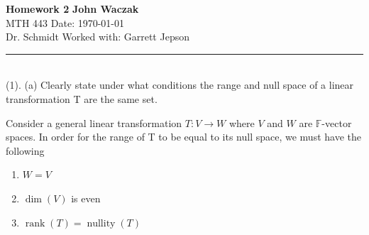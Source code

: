 \documentclass[a4paper, 11pt]{article}
\newcommand{\F}{\mathbb{F}}
\newenvironment{solution}{%
	\begin{list}{}{%
			\setlength{\topsep}{0pt}%
			\setlength{\leftmargin}{1.5cm}%
			\setlength{\rightmargin}{1.5cm}%
			\setlength{\listparindent}{\parindent}%
			\setlength{\itemindent}{\parindent}%
			\setlength{\parsep}{\parskip}%
		}%
		\item[]}{\end{list}}
\begin{document}
\noindent
\large\textbf{Homework 2} \hfill \textbf{John Waczak} \\
\normalsize MTH 443 \hfill  Date: \today \\
Dr. Schmidt \hfill Worked with: Garrett Jepson 
\par\noindent\rule{\textwidth}{0.4pt} \\

\noindent(1). (a) Clearly state under what conditions the range and null space of a linear transformation T are the same set. 
	\begin{solution}
		\noindent Consider a general linear transformation $T:V\to W$ where $V$ and $W$ are $\F$-vector spaces. In order for the range of T to be equal to its null space, we must have the following
			\begin{enumerate}
				\item $W = V$ 
				\item $\dim(V)$ is even 
				\item $\operatorname{rank}(T) = \operatorname{nullity}(T)$
			\end{enumerate}
	\end{solution}
\end{document}
